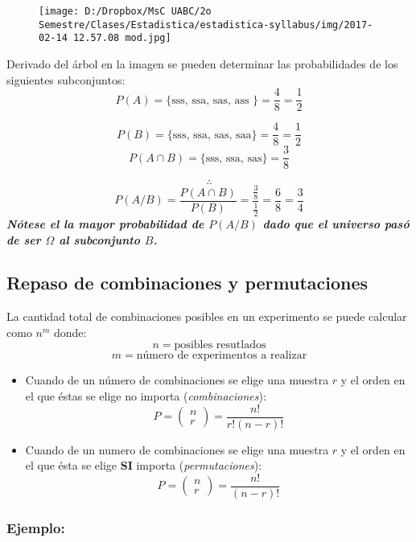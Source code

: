 \documentclass[]{book}
\begin{document}
\begin{figure}[htbp]
\centering
\texttt{[image: D:/Dropbox/MsC UABC/2o Semestre/Clases/Estadistica/estadistica-syllabus/img/2017-02-14 12.57.08 mod.jpg]}
\caption{}
\end{figure}

Derivado del árbol en la imagen se pueden determinar las probabilidades
de los siguientes subconjuntos:
\[P(A) = \{\text{sss, ssa, sas, ass }\} = \frac {4}{8} = \frac {1}{2}\]

\[P(B) = \{\text{sss, ssa, sas, saa}\} = \frac{4}{8} = \frac{1}{2}\]
\[P(A\cap B) = \{\text{sss, ssa, sas}\} = \frac{3}{8}\]

\[\therefore\]
\[P(A/B) = \frac {P(A\cap B)}{P(B)} = \frac {\frac {3}{8}}{\frac {1}{2}} = \frac {6}{8} = \frac {3}{4}\]
\textbf{\emph{Nótese el la mayor probabilidad de \(P(A/B)\) dado que el
universo pasó de ser \(\Omega\) al subconjunto \(B\).}}

\subsection{Repaso de combinaciones y
permutaciones}\label{repaso-de-combinaciones-y-permutaciones}

 La cantidad total de combinaciones posibles en un experimento se puede
calcular como \(n^m\) donde: \[n = \text{posibles resutlados}\]
\[m = \text{número de experimentos a realizar}\]

\begin{itemize}
\item
  Cuando de un número de combinaciones se elige una muestra \(r\) y el
  orden en el que éstas se elige no importa (\emph{combinaciones}):
  \[P = \left( \begin{array}{c} n \\ r \end{array} \right) = \frac {n!}{r!(n-r)!}\]
\item
  Cuando de un numero de combinaciones se elige una muestra \(r\) y el
  orden en el que ésta se elige \textbf{SI} importa
  (\emph{permutaciones}):
  \[P = \left( \begin{array}{c} n \\ r \end{array} \right) = \frac {n!}{(n-r)!}\]
\end{itemize}

\subsubsection{Ejemplo:}\label{ejemplo}
\end{document}
